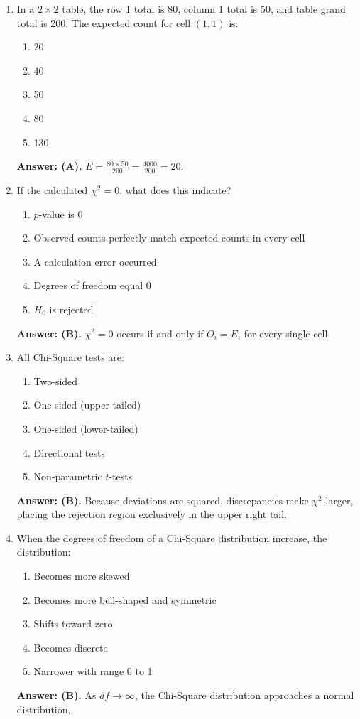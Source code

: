 \begin{enumerate}[leftmargin=1.5em]
  \item In a $2 \times 2$ table, the row 1 total is 80, column 1 total is 50, and table grand total is 200. The expected count for cell $(1, 1)$ is:
  \begin{enumerate}[label=(\Alph*)]
    \item 20 \item 40 \item 50 \item 80 \item 130
  \end{enumerate}
  \textbf{Answer: (A).} $E = \frac{80 \times 50}{200} = \frac{4000}{200} = 20$.

  \item If the calculated $\chi^2 = 0$, what does this indicate?
  \begin{enumerate}[label=(\Alph*)]
    \item $p$-value is 0 \item Observed counts perfectly match expected counts in every cell \item A calculation error occurred \item Degrees of freedom equal 0 \item $H_0$ is rejected
  \end{enumerate}
  \textbf{Answer: (B).} $\chi^2 = 0$ occurs if and only if $O_i = E_i$ for every single cell.

  \item All Chi-Square tests are:
  \begin{enumerate}[label=(\Alph*)]
    \item Two-sided \item One-sided (upper-tailed) \item One-sided (lower-tailed) \item Directional tests \item Non-parametric $t$-tests
  \end{enumerate}
  \textbf{Answer: (B).} Because deviations are squared, discrepancies make $\chi^2$ larger, placing the rejection region exclusively in the upper right tail.

  \item When the degrees of freedom of a Chi-Square distribution increase, the distribution:
  \begin{enumerate}[label=(\Alph*)]
    \item Becomes more skewed \item Becomes more bell-shaped and symmetric \item Shifts toward zero \item Becomes discrete \item Narrower with range 0 to 1
  \end{enumerate}
  \textbf{Answer: (B).} As $df \to \infty$, the Chi-Square distribution approaches a normal distribution.


\end{enumerate}
